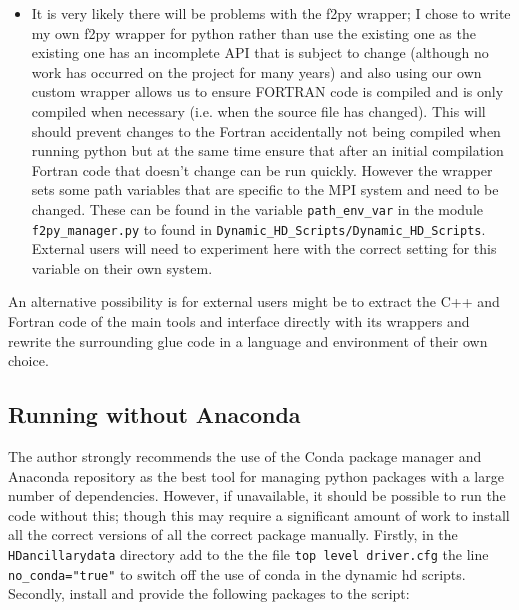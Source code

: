 \documentclass{article}
\begin{document}
\begin{itemize}
\item It is very likely there will be problems with the f2py wrapper; I chose to write my own f2py wrapper for python rather than use the existing one as the existing one has an incomplete API that is subject to change (although no work has occurred on the project for many years) and also using our own custom wrapper allows us to ensure FORTRAN code is compiled and is only compiled when necessary (i.e. when the source file has changed). This will should prevent changes to the Fortran accidentally not being compiled when running python but at the same time ensure that after an initial compilation Fortran code that doesn't change can be run quickly. However the wrapper sets some path variables that are specific to the MPI system and need to be changed. These can be found in the variable \lstinline[style=bash_input]{path_env_var} in the module \lstinline[style=bash_input]{f2py_manager.py} to found in \lstinline[style=bash_input]{Dynamic_HD_Scripts/Dynamic_HD_Scripts}. External users will need to experiment here with the correct setting for this variable on their own system.
\end{itemize}
An alternative possibility is for external users might be to extract the C++ and Fortran code of the main tools and interface directly with its wrappers and rewrite the surrounding glue code in a language and environment of their own choice.
\subsection{Running without Anaconda}

The author strongly recommends the use of the Conda package manager and Anaconda repository as the best tool for managing python packages with a large number of dependencies. However, if unavailable, it should be possible to run the code without this; though this may require a significant amount of work to install all the correct versions of all the correct package manually. Firstly, in the \lstinline[style=bash_input]{HDancillarydata} directory add to the the file  \lstinline[style=bash_input]{top level driver.cfg} the line \lstinline[style=bash_input]{no_conda="true"} to switch off the use of conda in the dynamic hd scripts. Secondly, install and provide the following packages to the script:
\end{document}
